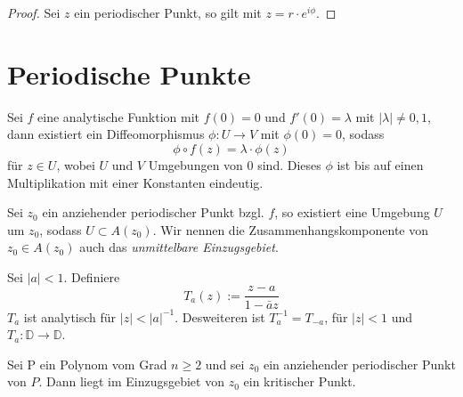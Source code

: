 \documentclass{mywork}
\newcommand{\D}{\mathbb{D}}
\begin{document}
\begin{proof}
Sei $z$ ein periodischer Punkt, so gilt mit $z=r\cdot e^{i\phi}$. \fixme
\end{proof}




\section{Periodische Punkte}

\begin{thm} \label{11}
Sei $f$ eine analytische Funktion mit $f(0)=0$ und $f'(0)=\lambda$ mit 
$|\lambda|\neq0,1$, dann existiert ein Diffeomorphismus $\phi: U\to V$ mit 
$\phi(0)=0$, sodass 
\[
\phi \circ f(z)=\lambda\cdot \phi(z)
\] 
für $z\in U$, wobei $U$ und $V$ Umgebungen von $0$ sind. Dieses $\phi$ ist bis auf einen Multiplikation mit einer Konstanten eindeutig.
\end{thm}


\begin{prop}
Sei $z_0$ ein anziehender periodischer Punkt bzgl. $f$, so existiert eine Umgebung $U$ um $z_0$, sodass $U\subset A(z_0)$. Wir nennen die Zusammenhangskomponente von $z_0\in A(z_0)$ auch das \emph{unmittelbare Einzugsgebiet}.
\end{prop}


\begin{lem}
Sei $|a|<1$. Definiere
\[
T_a(z):=\frac{z-a}{1-\bar a z}
\]
$T_a$ ist analytisch für $|z|<|a|^{-1}$. Desweiteren ist $T_a^{-1}=T_{-a}$, für $|z|<1$ und $T_a:\D\to \D$.
\end{lem}
\begin{thm}
Sei P ein Polynom vom Grad $n\ge 2$ und sei $z_0$ ein anziehender periodischer Punkt von $P$. Dann liegt im Einzugsgebiet von $z_0$ ein kritischer Punkt.
\end{thm}
\end{document}
